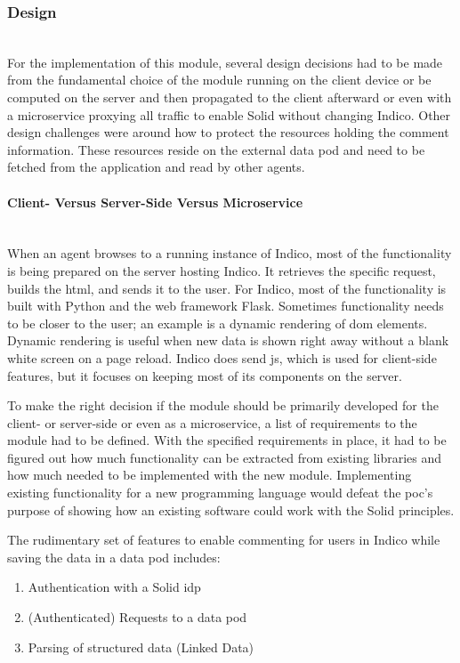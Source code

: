 \subsubsection{Design}\label{subsubsection:design}\mbox{}\\

For the implementation of this module, several design decisions had to be made from the fundamental choice of the module running on the client device or be computed on the server and then propagated to the client afterward or even with a microservice proxying all traffic to enable Solid without changing Indico.
Other design challenges were around how to protect the resources holding the comment information. These resources reside on the external data pod and need to be fetched from the application and read by other agents.
\vspace{0.5cm}
\paragraph{Client- Versus Server-Side Versus Microservice}\mbox{}\\

When an agent browses to a running instance of Indico, most of the functionality is being prepared on the server hosting Indico. It retrieves the specific request, builds the \gls{html}, and sends it to the user. For Indico, most of the functionality is built with Python and the web framework Flask. Sometimes functionality needs to be closer to the user; an example is a dynamic rendering of \gls{dom} elements. Dynamic rendering is useful when new data is shown right away without a blank white screen on a page reload. Indico does send \gls{js}, which is used for client-side features, but it focuses on keeping most of its components on the server.

To make the right decision if the module should be primarily developed for the client- or server-side or even as a microservice, a list of requirements to the module had to be defined. With the specified requirements in place, it had to be figured out how much functionality can be extracted from existing libraries and how much needed to be implemented with the new module. Implementing existing functionality for a new programming language would defeat the \gls{poc}’s purpose of showing how an existing software could work with the Solid principles.

The rudimentary set of features to enable commenting for users in Indico while saving the data in a data pod includes: 
\begin{enumerate}
    \item Authentication with a Solid \gls{idp}
    \item (Authenticated) Requests to a data pod
    \item Parsing of structured data (Linked Data)
\end{enumerate}
\vspace{0.5cm}
